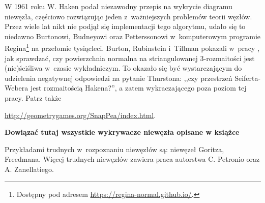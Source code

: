 W 1961 roku W. Haken \cite{haken61} podał niezawodny przepis na wykrycie diagramu niewęzła,
częściowo rozwiązując jeden z~ważniejszych problemów teorii węzłów.
Przez wiele lat nikt nie podjął się implementacji tego algorytmu,
udało się to niedawno Burtonowi, Budneyowi oraz Petterssonowi w~komputerowym programie Regina\footnote{Dostępny pod adresem \url{https://regina-normal.github.io/}.} na przełomie tysiącleci.
Burton, Rubinstein i~Tillman pokazali w~pracy \cite{burton12}, jak sprawdzać,
czy powierzchnia normalna na striangulowanej 3-rozmaitości jest (nie)ściśliwa w~czasie wykładniczym.
To okazało się być wystarczającym do udzielenia negatywnej odpowiedzi na pytanie Thurstona:
,,czy przestrzeń Seiferta-Webera jest rozmaitością Hakena?'',
a zatem wykraczającego poza poziom tej pracy.
Patrz także {\url{http://geometrygames.org/SnapPea/index.html}.

{\color{red}\textbf{Dowiązać tutaj wszystkie wykrywacze niewęzła opisane w książce}}

Przykładami trudnych w~rozpoznaniu niewęzłów są: niewęzeł Goritza, Freedmana.
Więcej trudnych niewęzłów zawiera praca \cite{zanellati16} autorstwa C. Petronio oraz A. Zanellatiego.

}
